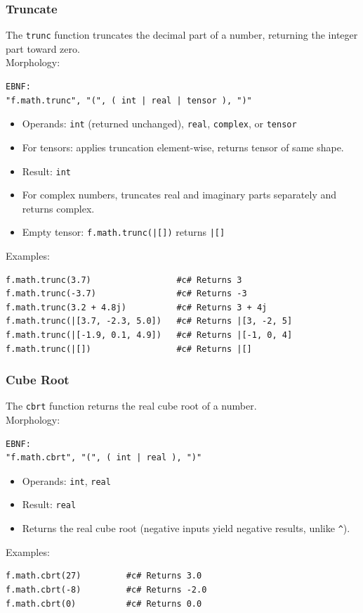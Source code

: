 \subsubsection{Truncate}
The \texttt{trunc} function truncates the decimal part of a number, returning the integer part toward zero.\\
Morphology:
\begin{verbatim}
EBNF:
"f.math.trunc", "(", ( int | real | tensor ), ")"
\end{verbatim}
\begin{itemize}
\item Operands: \texttt{int} (returned unchanged), \texttt{real}, \texttt{complex}, or \texttt{tensor}
\item For tensors: applies truncation element-wise, returns tensor of same shape.
\item Result: \texttt{int}
\item For complex numbers, truncates real and imaginary parts separately and returns complex.
\item Empty tensor: \texttt{f.math.trunc(|[])} returns \texttt{|[]}
\end{itemize}
Examples:
\begin{verbatim}
f.math.trunc(3.7)                 #c# Returns 3
f.math.trunc(-3.7)                #c# Returns -3
f.math.trunc(3.2 + 4.8j)          #c# Returns 3 + 4j
f.math.trunc(|[3.7, -2.3, 5.0])   #c# Returns |[3, -2, 5]
f.math.trunc(|[-1.9, 0.1, 4.9])   #c# Returns |[-1, 0, 4]
f.math.trunc(|[])                 #c# Returns |[]
\end{verbatim}

\subsubsection{Cube Root}
The \texttt{cbrt} function returns the real cube root of a number.\\
Morphology:
\begin{verbatim}
EBNF:
"f.math.cbrt", "(", ( int | real ), ")"
\end{verbatim}
\begin{itemize}
\item Operands: \texttt{int}, \texttt{real}
\item Result: \texttt{real}
\item Returns the real cube root (negative inputs yield negative results, unlike \texttt{\^{}}).
\end{itemize}
Examples:
\begin{verbatim}
f.math.cbrt(27)         #c# Returns 3.0
f.math.cbrt(-8)         #c# Returns -2.0
f.math.cbrt(0)          #c# Returns 0.0
\end{verbatim}

